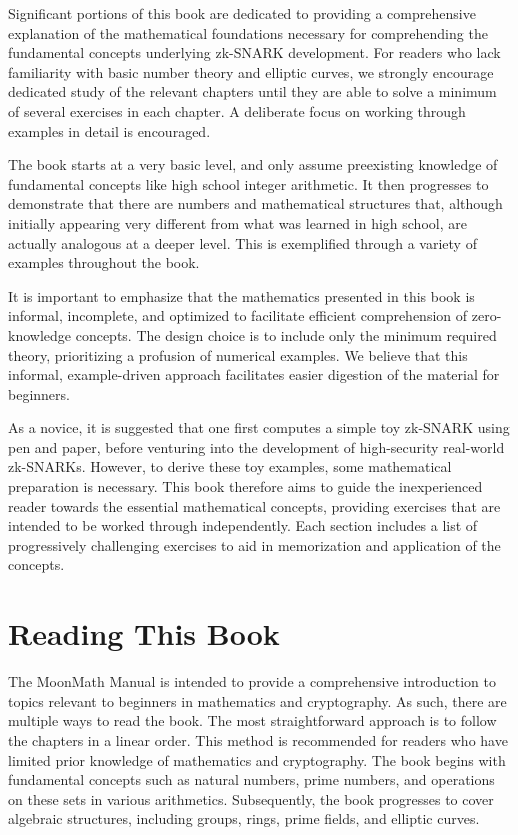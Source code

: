 Significant portions of this book are dedicated to providing a comprehensive explanation of the mathematical foundations necessary for comprehending the fundamental concepts underlying zk-SNARK development. For readers who lack familiarity with basic number theory and elliptic curves, we strongly encourage dedicated study of the relevant chapters until they are able to solve a minimum of several exercises in each chapter. A deliberate focus on working through examples in detail is encouraged.

The book starts at a very basic level, and only assume preexisting knowledge of fundamental concepts like high school integer arithmetic. It then progresses to demonstrate that there are numbers and mathematical structures that, although initially appearing very different from what was learned in high school, are actually analogous at a deeper level. This is exemplified through a variety of examples throughout the book.

It is important to emphasize that the mathematics presented in this book is informal, incomplete, and optimized to facilitate efficient comprehension of zero-knowledge concepts. The design choice is to include only the minimum required theory, prioritizing a profusion of numerical examples. We believe that this informal, example-driven approach facilitates easier digestion of the material for beginners.

As a novice, it is suggested that one first computes a simple toy zk-SNARK using pen and paper, before venturing into the development of high-security real-world zk-SNARKs. However, to derive these toy examples, some mathematical preparation is necessary. This book therefore aims to guide the inexperienced reader towards the essential mathematical concepts, providing exercises that are intended to be worked through independently. Each section includes a list of progressively challenging exercises to aid in memorization and application of the concepts.


\section{Reading This Book}
The MoonMath Manual is intended to provide a comprehensive introduction to topics relevant to beginners in mathematics and cryptography. As such, there are multiple ways to read the book. The most straightforward approach is to follow the chapters in a linear order. This method is recommended for readers who have limited prior knowledge of mathematics and cryptography. The book begins with fundamental concepts such as natural numbers, prime numbers, and operations on these sets in various arithmetics. Subsequently, the book progresses to cover algebraic structures, including groups, rings, prime fields, and elliptic curves.

